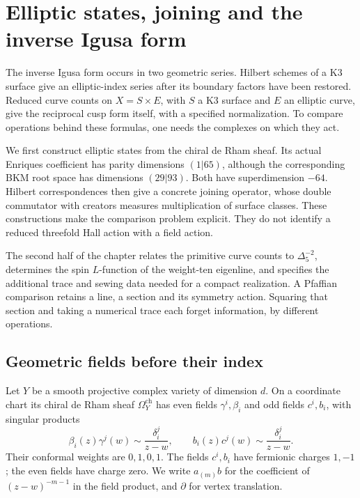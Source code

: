 \chapter{Elliptic states, joining and the inverse Igusa form}
\label{ch:zbps-realization}

The inverse Igusa form occurs in two geometric series.  Hilbert
schemes of a K3 surface give an elliptic-index series after its
boundary factors have been restored.  Reduced curve counts on
\(X=S\times E\), with \(S\) a K3 surface and \(E\) an elliptic
curve, give the reciprocal cusp form itself, with a specified
normalization.  To compare operations behind these formulas, one
needs the complexes on which they act.

We first construct elliptic states from the chiral de Rham sheaf.
Its actual Enriques coefficient has parity dimensions \((1|65)\),
although the corresponding BKM root space has dimensions
\((29|93)\).  Both have superdimension \(-64\).  Hilbert
correspondences then give a concrete joining operator, whose double
commutator with creators measures multiplication of surface classes.
These constructions make the comparison problem explicit.  They do
not identify a reduced threefold Hall action with a field action.

The second half of the chapter relates the primitive curve counts
to \(\Delta_5^{-2}\), determines the spin \(L\)-function of the
weight-ten eigenline, and specifies the additional trace and sewing
data needed for a compact realization.  A Pfaffian comparison
retains a line, a section and its symmetry action.  Squaring that
section and taking a numerical trace each forget information, by
different operations.

\section{Geometric fields before their index}
\label{sec:zbps-geometric-fields}

Let \(Y\) be a smooth projective complex variety of dimension \(d\).
On a coordinate chart its chiral de Rham sheaf
\(\Omega_Y^{\mathrm{ch}}\) has even fields \(\gamma^i,\beta_i\)
and odd fields \(c^i,b_i\), with singular products
\[
 \beta_i(z)\gamma^j(w)\sim\frac{\delta_i^j}{z-w},
 \qquad b_i(z)c^j(w)\sim\frac{\delta_i^j}{z-w}.
\]
Their conformal weights are \(0,1,0,1\).  The fields \(c^i,b_i\)
have fermionic charges \(1,-1\); the even fields have charge zero.
We write \(a_{(m)}b\) for the coefficient of
\((z-w)^{-m-1}\) in the field product, and \(\partial\) for
vertex translation.

